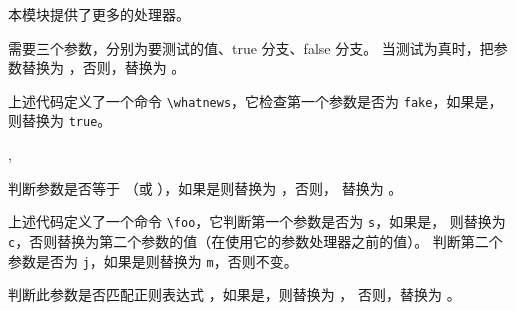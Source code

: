 \documentclass{whudoc}
\begin{document}
本模块提供了更多的处理器。

\begin{function}{\ReplaceArgumentIf}
  \begin{syntax}
    \V\ReplaceArgumentIf {}  
  \end{syntax}
 需要三个参数，分别为要测试的值、true 分支、false 分支。
当测试为真时，把参数替换为 ，否则，替换为 。
\end{function}


上述代码定义了一个命令 \verb|\whatnews|，它检查第一个参数是否为 \verb|fake|，如果是，
则替换为 \verb|true|。

\begin{function}{\ReplaceArgumentIfEqual,\ReplaceArgumentIfStrEqual}
  \begin{syntax}
    \V\ReplaceArgumentIfEqual    {}  
    \V\ReplaceArgumentIfStrEqual {}  
  \end{syntax}
判断参数是否等于 （或 ），如果是则替换为 ，否则，
替换为 。
\end{function}


上述代码定义了一个命令 \verb|\foo|，它判断第一个参数是否为 \verb|s|，如果是，
则替换为 \verb|c|，否则替换为第二个参数的值（在使用它的参数处理器之前的值）。
判断第二个参数是否为 \verb|j|，如果是则替换为 \verb|m|，否则不变。

\begin{function}{\ReplaceArgumentIfMatch}
  \begin{syntax}
    \V\ReplaceArgumentIfMatch {}  
  \end{syntax}
判断此参数是否匹配正则表达式 ，如果是，则替换为 ，
否则，替换为 。
\end{function}
\end{document}
